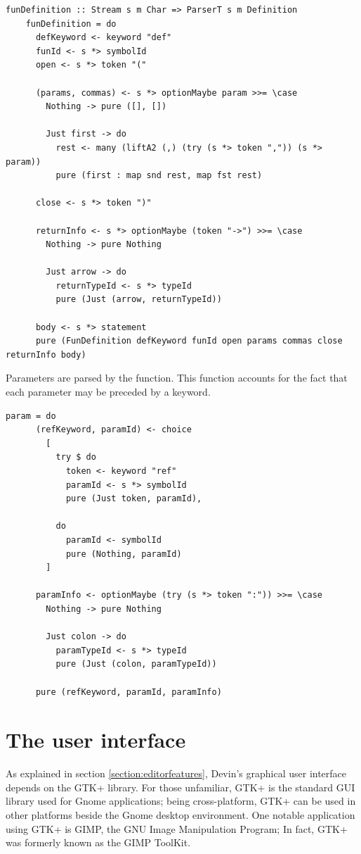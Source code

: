 \documentclass[UdineBachThesis,american,11pt,draft]{PhdThesis}
\begin{document}
  \begin{lstlisting}[gobble=4,basicstyle=\ttfamily\small]
    funDefinition :: Stream s m Char => ParserT s m Definition
    funDefinition = do
      defKeyword <- keyword "def"
      funId <- s *> symbolId
      open <- s *> token "("

      (params, commas) <- s *> optionMaybe param >>= \case
        Nothing -> pure ([], [])

        Just first -> do
          rest <- many (liftA2 (,) (try (s *> token ",")) (s *> param))
          pure (first : map snd rest, map fst rest)

      close <- s *> token ")"

      returnInfo <- s *> optionMaybe (token "->") >>= \case
        Nothing -> pure Nothing

        Just arrow -> do
          returnTypeId <- s *> typeId
          pure (Just (arrow, returnTypeId))

      body <- s *> statement
      pure (FunDefinition defKeyword funId open params commas close returnInfo body)
  \end{lstlisting}

  Parameters are parsed by the \lstinline@param@ function. This function
  accounts for the fact that each parameter may be preceded by a \lstinline@ref@
  keyword.

  \begin{lstlisting}[gobble=4,basicstyle=\ttfamily\small]
    param = do
      (refKeyword, paramId) <- choice
        [
          try $ do
            token <- keyword "ref"
            paramId <- s *> symbolId
            pure (Just token, paramId),

          do
            paramId <- symbolId
            pure (Nothing, paramId)
        ]

      paramInfo <- optionMaybe (try (s *> token ":")) >>= \case
        Nothing -> pure Nothing

        Just colon -> do
          paramTypeId <- s *> typeId
          pure (Just (colon, paramTypeId))

      pure (refKeyword, paramId, paramInfo)
  \end{lstlisting}

  \section{The user interface}

  As explained in section \ref{section:editorfeatures}, Devin's graphical user
  interface depends on the GTK+ library. For those unfamiliar, GTK+ is the
  standard GUI library used for Gnome applications; being cross-platform, GTK+
  can be used in other platforms beside the Gnome desktop environment. One
  notable application using GTK+ is GIMP, the GNU Image Manipulation Program; In
  fact, GTK+ was formerly known as the GIMP ToolKit.
\end{document}
